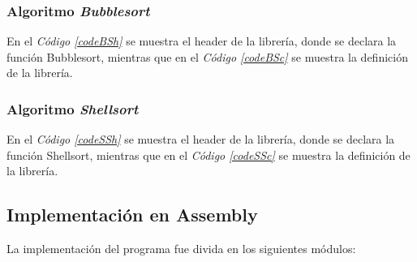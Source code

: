 \documentclass{article}
\newcommand{\refcode}[1]{\textit{Código \ref{#1}}}
\begin{document}
\subsubsection{Algoritmo \textit{Bubblesort}}

	En el \refcode{codeBSh} se muestra el header de la librería, donde se declara la función Bubblesort, mientras que en el \refcode{codeBSc} se muestra la definición de la librería.

\lstset{ language = C } %
 
\bigskip


\lstset{ language = C } %
 
\bigskip\bigskip




\subsubsection{Algoritmo \textit{Shellsort}}

	En el \refcode{codeSSh} se muestra el header de la librería, donde se declara la función Shellsort, mientras que en el \refcode{codeSSc} se muestra la definición de la librería.

\lstset{ language = C } %
 
\bigskip


\lstset{ language = C } %
 
\bigskip\bigskip




\newpage
\subsection{Implementación en Assembly}

	La implementación del programa fue divida en los siguientes módulos:
	\medskip
\end{document}
